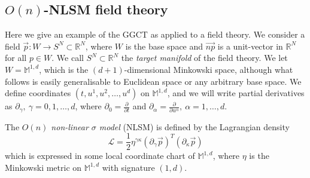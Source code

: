 






\subsection{$O(n)$-NLSM field theory} \label{sec:The O(3) non-linear sigma model}

Here we give an example of the GGCT as applied to a field theory. We consider a field $\vec{p} : W \to S^N \subset \mathbb{R}^N$, where $W$ is the base space and $\vec{np}$ is a unit-vector in $\mathbb{R}^N$ for all $p \in W$. We call $S^N \subset \mathbb{R}^N$ the \textit{target manifold} of the field theory. We let $W = \mathbb{M}^{1,d}$, which is the $(d+1)$-dimensional Minkowski space, although what follows is easily generalisable to Euclidean space or any arbitrary base space.  
 We define coordinates $(t, u^1, u^2, \dots, u^d)$ on $\mathbb{M}^{1,d}$, and we will write partial derivatives as $\partial_\gamma,\ \gamma=0,1,\dots,d$, where $\partial_0 = \frac{\partial}{\partial t}$ and $\partial_\alpha = \frac{\partial}{\partial u^\alpha},\ \alpha=1,\dots,d$.

The \textit{$O(n)$ non-linear $\sigma$ model} (NLSM) \citep{ketovQuantumNonlinearSigmaModels2013} is defined by the Lagrangian density
\begin{equation} \label{eq:O(n) model}
\mathcal{L} = \frac{1}{2} \eta^{\gamma \kappa} (\partial_\gamma \vec{p})^T (\partial_\kappa \vec{p}) 
\end{equation}
which is expressed in some local coordinate chart of $\mathbb{M}^{1,d}$, where $\eta$ is the Minkowski metric on $\mathbb{M}^{1,d}$ with signature $(1,d)$.

